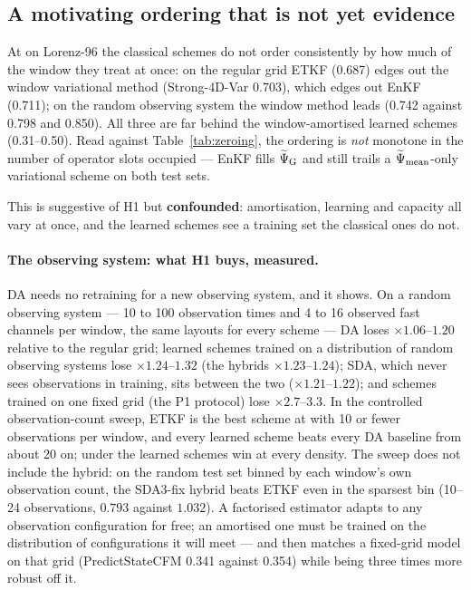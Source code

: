 \subsection{A motivating ordering that is not yet evidence}
\label{sec:ordering}

At \Sz{} on Lorenz-96 the classical schemes do not order consistently by how
much of the window they treat at once: on the regular grid ETKF (0.687) edges out
the window variational method (Strong-4D-Var 0.703), which edges out EnKF
(0.711); on the random observing system the window method leads (0.742 against
0.798 and 0.850). All three are far behind the window-amortised learned schemes
(0.31--0.50). Read against Table~\ref{tab:zeroing}, the ordering is \emph{not}
monotone in the number of operator slots occupied --- EnKF fills $\widetilde{\Psi}_{\mathrm{G}}$ and still
trails a $\widetilde{\Psi}_{\mathrm{mean}}$-only variational scheme on both test sets.

This is suggestive of H1 but \textbf{confounded}: amortisation, learning and
capacity all vary at once, and the learned schemes see a training set the
classical ones do not.

\paragraph{The observing system: what H1 buys, measured.}
DA needs no retraining for a new observing system, and it shows. On a random
observing system --- 10 to 100 observation times and 4 to 16 observed fast
channels per window, the same layouts for every scheme --- DA loses
$\times 1.06$--$1.20$ relative to the regular grid; learned schemes trained on a
distribution of random observing systems lose $\times 1.24$--$1.32$ (the hybrids
$\times 1.23$--$1.24$); SDA, which never sees observations in training, sits
between the two ($\times 1.21$--$1.22$); and schemes trained on one fixed grid
(the P1 protocol) lose $\times 2.7$--$3.3$. In the controlled observation-count
sweep, ETKF is the best scheme at \Sz{} with 10 or fewer observations per window,
and every learned scheme beats every DA baseline from about 20 on; under \So{} the
learned schemes win at every density. The sweep does not include the hybrid: on
the random test set binned by each window's own observation count, the SDA3-fix
hybrid beats ETKF even in the sparsest bin (10--24 observations, $0.793$ against
$1.032$). A factorised estimator
adapts to any observation configuration for free; an amortised one must be
trained on the distribution of configurations it will meet --- and then matches a
fixed-grid model on that grid (PredictStateCFM 0.341 against 0.354) while being
three times more robust off it.
